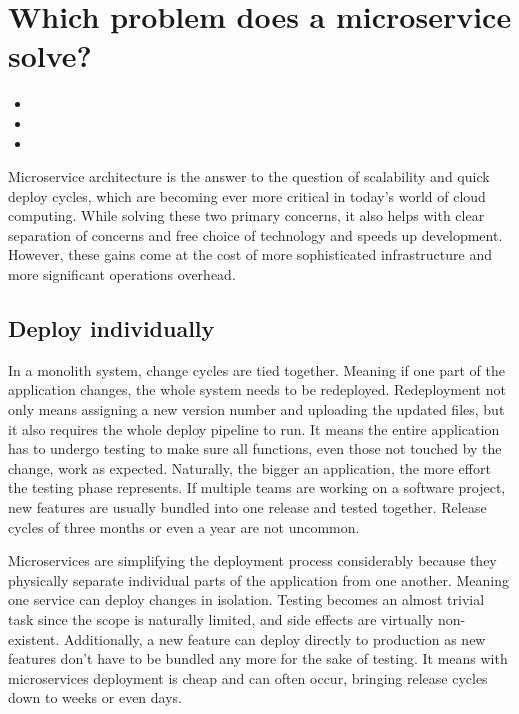 \section{Which problem does a microservice solve?}
\label{sec:theory:what-problem}

\begin{itemize}
  \item {}
  \item {}
  \item {}
\end{itemize}

Microservice architecture is the answer to the question of scalability and quick deploy cycles, which are becoming ever more critical in today's world of cloud computing. While solving these two primary concerns, it also helps with clear separation of concerns and free choice of technology and speeds up development. However, these gains come at the cost of more sophisticated infrastructure and more significant operations overhead.

\subsection{Deploy individually}

In a monolith system, change cycles are tied together. Meaning if one part of the application changes, the whole system needs to be redeployed. Redeployment not only means assigning a new version number and uploading the updated files, but it also requires the whole deploy pipeline to run. It means the entire application has to undergo testing to make sure all functions, even those not touched by the change, work as expected. Naturally, the bigger an application, the more effort the testing phase represents. If multiple teams are working on a software project, new features are usually bundled into one release and tested together. Release cycles of three months or even a year are not uncommon.

Microservices are simplifying the deployment process considerably because they physically separate individual parts of the application from one another. Meaning one service can deploy changes in isolation. Testing becomes an almost trivial task since the scope is naturally limited, and side effects are virtually non-existent. Additionally, a new feature can deploy directly to production as new features don't have to be bundled any more for the sake of testing. It means with microservices deployment is cheap and can often occur, bringing release cycles down to weeks or even days.


